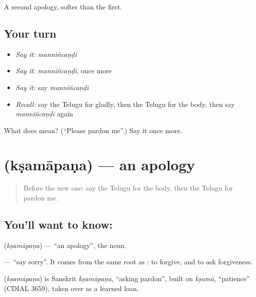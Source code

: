 \begin{grammarlens}[title={What you've built}]
A second apology, softer than the first.
\end{grammarlens}

\subsection*{Your turn}
\begin{itemize}
\raggedright
  \item \emph{Say it:} \emph{manniñcaṇḍi}
  \item \emph{Say it:} \emph{manniñcaṇḍi}, once more
  \item \emph{Say it:} say \emph{manniñcaṇḍi}
  \item \emph{Recall:} say the Telugu for gladly, then the Telugu for the body, then say \emph{manniñcaṇḍi} again
\end{itemize}

\begin{tcolorbox}[breakable,colback=teal!4,colframe=teal!35!black,title={Before you move on}]
What does  mean? (\textquotedblleft{}Please pardon me\textquotedblright{}.) Say it once more.
\end{tcolorbox}
\section[\texorpdfstring{\te{క్షమాపణ} (kṣamāpaṇa)}{క్షమాపణ (kṣamāpaṇa)}]{ (kṣamāpaṇa) — an apology}

\label{lesson:TE-C94-apology}



\begin{quote}
Before the new one: say the Telugu for the body, then the Telugu for pardon me.
\end{quote}

\subsection*{You'll want to know: }
\textbf{} (\emph{kṣamāpaṇa}) — \textquotedblleft{}an apology\textquotedblright{}, the noun.

\textbf{ } — \textquotedblleft{}say sorry\textquotedblright{}. It comes from the same root as \textbf{}: to forgive, and to ask forgiveness.

\begin{cousinweb}
\textbf{} (\emph{kṣamāpaṇa}) is Sanskrit \emph{kṣamāpaṇa}, \textquotedblleft{}asking pardon\textquotedblright{}, built on \emph{kṣamā}, \textquotedblleft{}patience\textquotedblright{} (CDIAL 3659), taken over as a learned loan.
\end{cousinweb}

